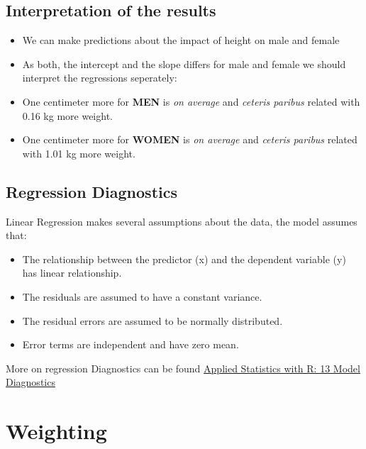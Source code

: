 \documentclass[
  doc]{apa6}
\providecommand{\tightlist}{%
  \setlength{\itemsep}{0pt}\setlength{\parskip}{0pt}}
\begin{document}
\newpage

\hypertarget{interpretation-of-the-results}{%
\subsection{Interpretation of the results}\label{interpretation-of-the-results}}

\begin{itemize}
\tightlist
\item
  We can make predictions about the impact of height on male and female
\item
  As both, the intercept and the slope differs for male and female we should interpret the regressions seperately:
\item
  One centimeter more for \textbf{MEN} is \emph{on average} and \emph{ceteris paribus} related with 0.16 kg more weight.
\item
  One centimeter more for \textbf{WOMEN} is \emph{on average} and \emph{ceteris paribus} related with 1.01 kg more weight.
\end{itemize}

\hypertarget{regression-diagnostics}{%
\subsection{Regression Diagnostics}\label{regression-diagnostics}}

Linear Regression makes several assumptions about the data, the model assumes that:

\begin{itemize}
\tightlist
\item
  The relationship between the predictor (x) and the dependent variable (y) has linear relationship.
\item
  The residuals are assumed to have a constant variance.
\item
  The residual errors are assumed to be normally distributed.
\item
  Error terms are independent and have zero mean.
\end{itemize}

More on regression Diagnostics can be found \href{https://daviddalpiaz.github.io/appliedstats/model-diagnostics.html\#r-markdown-6}{Applied Statistics with R: 13 Model Diagnostics}

\newpage

\hypertarget{weighting}{%
\section{Weighting}\label{weighting}}
\end{document}
